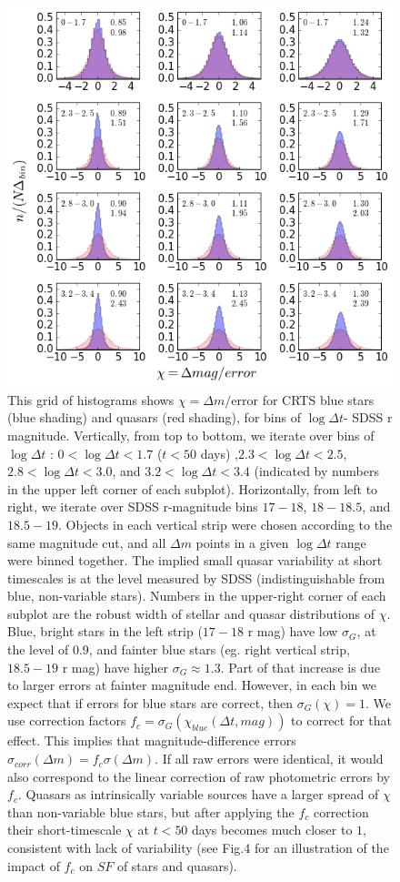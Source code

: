 \documentclass[fleqn,usenatbib]{mnras}  %
\begin{document}
\begin{figure}
\label{fig:3}
\includegraphics[width=1.1\columnwidth]{Fig_3_histogram_panels.png}
 \caption{This grid of histograms shows $\chi = \Delta m / \mathrm{error}$ for CRTS blue stars (blue shading) and quasars (red shading), for bins of $\log{\Delta t}$- SDSS r magnitude. Vertically, from top to bottom, we iterate over bins of $\log{\Delta t}$ : $0<\log{\Delta t}<1.7$ ($t < 50 $ days) ,$2.3<\log{\Delta t}<2.5$, $2.8<\log{\Delta t}<3.0$, and $3.2<\log{\Delta t}<3.4$ (indicated by numbers in the upper left corner of each subplot). Horizontally, from left to right, we iterate over SDSS r-magnitude bins $17-18$,  $18-18.5$, and $18.5-19$. Objects in each vertical strip were chosen according to the same magnitude cut, and all $\Delta m$ points in a given  $\log{\Delta t}$ range were binned together. The  implied small quasar variability at short timescales is at the level  measured by SDSS (indistinguishable from blue, non-variable stars). Numbers in the upper-right corner of each subplot are the robust width of stellar  and quasar  distributions of $\chi$. Blue, bright  stars in the left strip ($17-18$ r mag) have low $\sigma_{G}$, at the level of 0.9, and fainter blue stars (eg. right vertical strip, $18.5-19$ r mag) have higher $\sigma_{G} \approx 1.3$. Part of that increase is due to larger errors at fainter magnitude end. However, in each bin we expect that if errors for blue stars are correct, then  $\sigma_{G}(\chi) = 1$. We use  correction factors $f_{c} = \sigma_{G}(\chi_{blue}(\Delta t, mag))$ to correct for that effect. This implies that magnitude-difference errors  $\sigma_{corr} (\Delta m) = f_{c}\sigma (\Delta m) $. If all raw errors were identical, it would also correspond to the linear correction of raw photometric errors by $f_{c}$. Quasars  as intrinsically variable sources have a larger spread of $\chi$ than non-variable blue stars, but after applying the $f_{c}$ correction their short-timescale $\chi$ at $t < 50$ days becomes much closer to $1$, consistent with lack of variability (see Fig.4 for an illustration of the impact of $f_{c}$ on $SF$ of stars and quasars).}

\end{figure}
\end{document}

